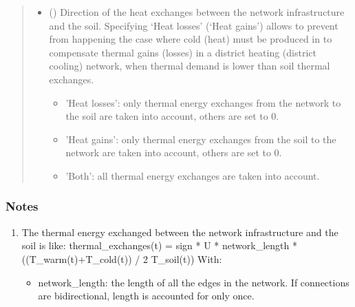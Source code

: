 \documentclass[letterpaper,10pt,english]{sphinxmanual}
\begin{document}
\begin{fulllineitems}
\begin{fulllineitems}
\begin{quote}
\begin{description}
\begin{itemize}
\item {} 
\sphinxAtStartPar
{} (\sphinxstyleliteralemphasis{\sphinxupquote{, }}\sphinxstyleliteralemphasis{\sphinxupquote{, }}\sphinxstyleliteralemphasis{\sphinxupquote{, }}\sphinxstyleliteralemphasis{\sphinxupquote{, }}) \textendash{} 
\sphinxAtStartPar
Direction of the heat exchanges between the network infrastructure and the soil.
Specifying ‘Heat losses’ (‘Heat gains’) allows to prevent from happening the case where
cold (heat) must be produced in  to compensate thermal gains (losses) in
a district heating (district cooling) network, when thermal demand is lower than soil thermal exchanges.
\begin{itemize}
\item {} 
\sphinxAtStartPar
’Heat losses’: only thermal energy exchanges from the network to the soil are taken into account,
others are set to 0.

\item {} 
\sphinxAtStartPar
’Heat gains’: only thermal energy exchanges from the soil to the network are taken into account,
others are set to 0.

\item {} 
\sphinxAtStartPar
’Both’: all thermal energy exchanges are taken into account.

\end{itemize}


\end{itemize}

\end{description}\end{quote}
\subsubsection*{Notes}
\begin{enumerate}
%
\item {} 
\sphinxAtStartPar
The thermal energy exchanged between the network infrastructure and the soil is like:
thermal\_exchanges(t) = sign * U * network\_length * ((T\_warm(t)+T\_cold(t)) / 2 \sphinxhyphen{} T\_soil(t))
With:
\begin{itemize}
\item {} 
\sphinxAtStartPar
network\_length: the length of all the edges in the network.
If connections are bidirectional, length is accounted for only once.


\end{itemize}
\end{enumerate}
\end{fulllineitems}
\end{fulllineitems}
\end{document}
